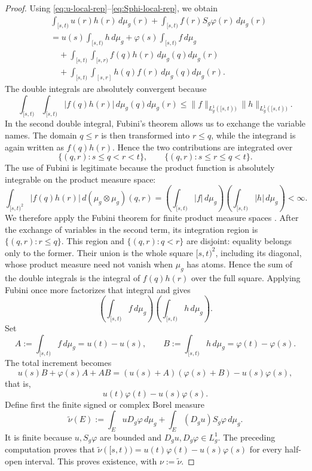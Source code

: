 \documentclass[preprint,12pt]{elsarticle}
\newenvironment{revision}{\begingroup\color{red}}{\endgroup}
\newenvironment{revision}{}{}
\theoremstyle{definition}
\theoremstyle{remark}
\newcommand{\mug}{\mu_g}
\begin{document}
\begin{proof}
Using \eqref{eq:u-local-rep}--\eqref{eq:Sphi-local-rep}, we obtain
\begin{align*}
 &\int_{[s,t)}u(r)h(r)\,d\mug(r)
 +\int_{[s,t)}f(r)S_g\varphi(r)\,d\mug(r)\\
 &=u(s)\int_{[s,t)}h\,d\mug
 +\varphi(s)\int_{[s,t)}f\,d\mug\\
 &\quad+\int_{[s,t)}\!\int_{[s,r)}f(q)h(r)\,d\mug(q)d\mug(r)\\
 &\quad+\int_{[s,t)}\!\int_{[s,r]}h(q)f(r)\,d\mug(q)d\mug(r).
\end{align*}
The double integrals are absolutely convergent because
\[
 \int_{[s,t)}\int_{[s,t)}|f(q)h(r)|\,d\mug(q)d\mug(r)
 \le \|f\|_{L_g^1([s,t))}\|h\|_{L_g^1([s,t))}.
\]
 In the second double integral, Fubini's theorem allows us to exchange the variable names. The domain $q\le r$ is then transformed into $r\le q$, while the integrand is again written as $f(q)h(r)$. Hence the two contributions are integrated over
\[
 \{(q,r):s\le q<r<t\},
 \qquad
 \{(q,r):s\le r\le q<t\}.
\]
 \begin{revision}
 The use of Fubini is legitimate because the product function is absolutely
 integrable on the product measure space:
 \[
  \int_{[s,t)^2}|f(q)h(r)|\,d(\mu_g\otimes\mu_g)(q,r)
  =\left(\int_{[s,t)}|f|\,d\mu_g\right)
   \left(\int_{[s,t)}|h|\,d\mu_g\right)<\infty.
 \]
 We therefore apply the Fubini theorem for finite product measure spaces
 \cite{Bartle1995}.  After the exchange of variables in the second
 term, its integration region is \(\{(q,r):r\le q\}\).  This region and
 \(\{(q,r):q<r\}\) are disjoint: equality belongs only to the former.  Their
 union is the whole square \([s,t)^2\), including its diagonal, whose product
 measure need not vanish when \(\mu_g\) has atoms.  Hence the sum of the double
 integrals is the integral of \(f(q)h(r)\) over the full square.  Applying
 Fubini once more factorizes that integral and gives
 \end{revision}
\[
 \left(\int_{[s,t)}f\,d\mug\right)
 \left(\int_{[s,t)}h\,d\mug\right).
\]
Set
\[
 A:=\int_{[s,t)}f\,d\mug=u(t)-u(s),
 \qquad
 B:=\int_{[s,t)}h\,d\mug=\varphi(t)-\varphi(s).
\]
The total increment becomes
\[
 u(s)B+\varphi(s)A+AB
 =(u(s)+A)(\varphi(s)+B)-u(s)\varphi(s),
\]
that is,
\[
 u(t)\varphi(t)-u(s)\varphi(s).
\]
 \begin{revision}
 Define first the finite signed or complex Borel measure
 \[
  \widetilde\nu(E)
  :=\int_E uD_g\varphi\,d\mu_g
    +\int_E(D_gu)S_g\varphi\,d\mu_g.
 \]
 It is finite because \(u,S_g\varphi\) are bounded and
 \(D_gu,D_g\varphi\in L_g^1\).  The preceding computation proves that
 \(\widetilde\nu([s,t))=u(t)\varphi(t)-u(s)\varphi(s)\) for every half-open
 interval.  This proves existence, with \(\nu:=\widetilde\nu\).


\end{revision}
\end{proof}
\end{document}
